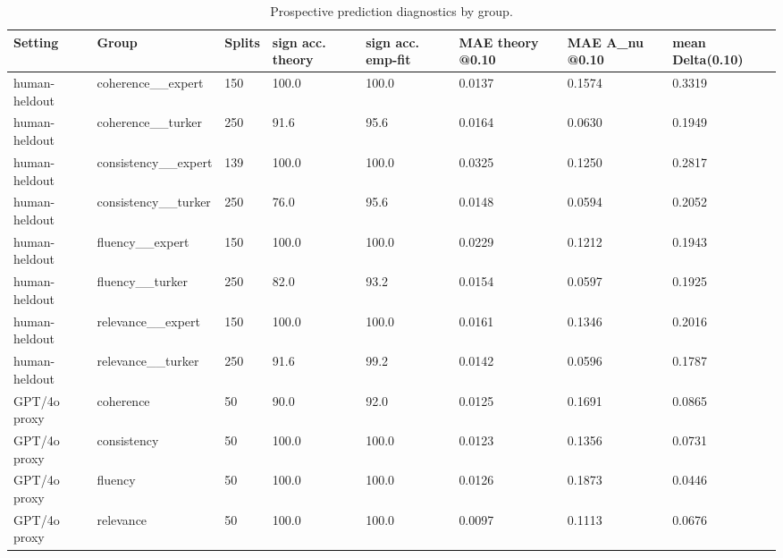 \begin{table}[t]
\centering
\small
\begin{tabular}{llllllll}
\toprule
Setting & Group & Splits & sign acc. theory & sign acc. emp-fit & MAE theory @0.10 & MAE A\_nu @0.10 & mean Delta(0.10) \\
\midrule
human-heldout & coherence\_\_expert & 150 & 100.0 & 100.0 & 0.0137 & 0.1574 & 0.3319 \\
human-heldout & coherence\_\_turker & 250 & 91.6 & 95.6 & 0.0164 & 0.0630 & 0.1949 \\
human-heldout & consistency\_\_expert & 139 & 100.0 & 100.0 & 0.0325 & 0.1250 & 0.2817 \\
human-heldout & consistency\_\_turker & 250 & 76.0 & 95.6 & 0.0148 & 0.0594 & 0.2052 \\
human-heldout & fluency\_\_expert & 150 & 100.0 & 100.0 & 0.0229 & 0.1212 & 0.1943 \\
human-heldout & fluency\_\_turker & 250 & 82.0 & 93.2 & 0.0154 & 0.0597 & 0.1925 \\
human-heldout & relevance\_\_expert & 150 & 100.0 & 100.0 & 0.0161 & 0.1346 & 0.2016 \\
human-heldout & relevance\_\_turker & 250 & 91.6 & 99.2 & 0.0142 & 0.0596 & 0.1787 \\
GPT/4o proxy & coherence & 50 & 90.0 & 92.0 & 0.0125 & 0.1691 & 0.0865 \\
GPT/4o proxy & consistency & 50 & 100.0 & 100.0 & 0.0123 & 0.1356 & 0.0731 \\
GPT/4o proxy & fluency & 50 & 100.0 & 100.0 & 0.0126 & 0.1873 & 0.0446 \\
GPT/4o proxy & relevance & 50 & 100.0 & 100.0 & 0.0097 & 0.1113 & 0.0676 \\
\bottomrule
\end{tabular}
\caption{Prospective prediction diagnostics by group.}
\label{tab:prediction-by-group}
\end{table}
